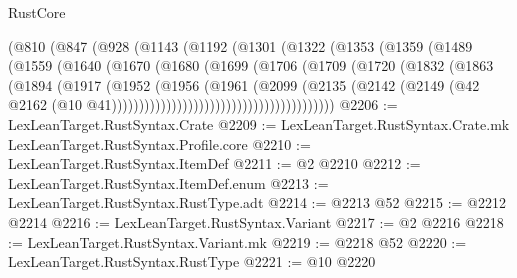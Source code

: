 \begin{lexlean}{RustCore}
\begin{coremodule}
                        (@810
                          (@847
                            (@928
                              (@1143
                                (@1192
                                  (@1301
                                    (@1322
                                      (@1353
                                        (@1359
                                          (@1489
                                            (@1559
                                              (@1640
                                                (@1670
                                                  (@1680
                                                    (@1699
                                                      (@1706
                                                        (@1709
                                                          (@1720
                                                            (@1832
                                                              (@1863
                                                                (@1894
                                                                  (@1917
                                                                    (@1952
                                                                      (@1956
                                                                        (@1961
                                                                          (@2099
                                                                            (@2135
                                                                              (@2142
                                                                                (@2149
                                                                                  (@42
                                                                                    @2162
                                                                                    (@10
                                                                                      @41)))))))))))))))))))))))))))))))))))))))))
@2206 := LexLeanTarget.RustSyntax.Crate
@2209 := LexLeanTarget.RustSyntax.Crate.mk LexLeanTarget.RustSyntax.Profile.core
@2210 := LexLeanTarget.RustSyntax.ItemDef
@2211 := @2 @2210
@2212 := LexLeanTarget.RustSyntax.ItemDef.enum
@2213 := LexLeanTarget.RustSyntax.RustType.adt
@2214 := @2213 @52
@2215 := @2212 @2214
@2216 := LexLeanTarget.RustSyntax.Variant
@2217 := @2 @2216
@2218 := LexLeanTarget.RustSyntax.Variant.mk
@2219 := @2218 @52
@2220 := LexLeanTarget.RustSyntax.RustType
@2221 := @10 @2220

\end{coremodule}
\end{lexlean}
